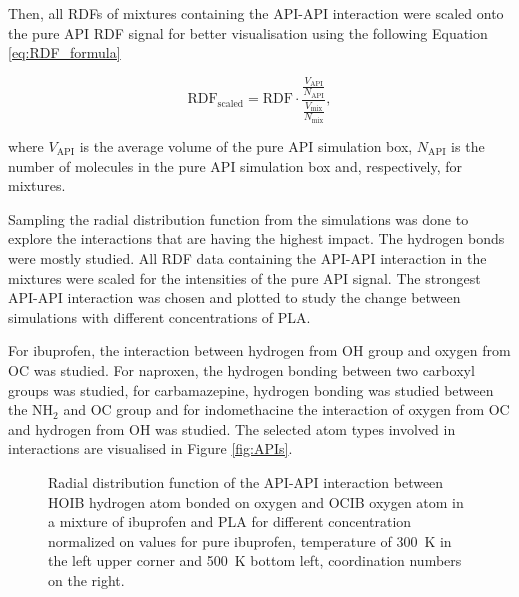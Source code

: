 Then, all RDFs of mixtures containing the API-API interaction were scaled onto the pure API RDF signal for better visualisation using the following Equation \ref{eq:RDF_formula}

\begin{equation}\label{eq:RDF_formula}
	\text{RDF}_{\text{scaled}} = \text{RDF} \cdot \frac{\displaystyle\frac{V_{\text{API}}}{N_{\text{API}}}}{\displaystyle{\frac{V_{\text{mix}}}{N_{\text{mix}}}}},
\end{equation}

where $V_{\text{API}}$ is the average volume of the pure API simulation box, $N_{\text{API}}$ is the number of molecules in the pure API simulation box and, respectively, for mixtures.

Sampling the radial distribution function from the simulations was done to explore the interactions that are having the highest impact. The hydrogen bonds were mostly studied. All RDF data containing the API-API interaction in the mixtures were scaled for the intensities of the pure API signal. The strongest API-API interaction was chosen and plotted to study the change between simulations with different concentrations of PLA. 

For ibuprofen, the interaction between hydrogen from OH group and oxygen from OC was studied. For naproxen, the hydrogen bonding between two carboxyl groups was studied, for carbamazepine, hydrogen bonding was studied between the N$\text{H}_\text{2}$ and OC group and for indomethacine the interaction of oxygen from OC and hydrogen from OH was studied.  The selected atom types involved in interactions are visualised in Figure \ref{fig:APIs}. 

\begin{figure}[htb!]
	\centering
	\caption{Radial distribution function of the API-API interaction between HOIB hydrogen atom bonded on oxygen and OCIB oxygen atom in a mixture of ibuprofen and PLA for different concentration normalized on values for pure ibuprofen, temperature of 300~K in the left upper corner and 500~K bottom left, coordination numbers on the right.}
	\label{fig:ibu_s_RDF_}
\end{figure}


